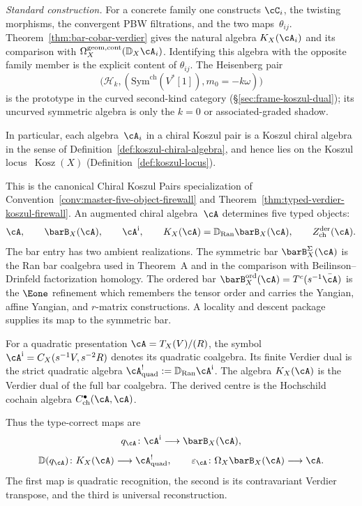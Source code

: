 \begin{definition}
\smallskip\noindent
\emph{Standard construction.}
For a concrete family one constructs $\cC_i$, the twisting morphisms,
the convergent PBW filtrations, and the two maps~$\theta_{ij}$.
Theorem~\ref{thm:bar-cobar-verdier} gives the natural algebra
$K_X(\cA_i)$ and its comparison with
$\Omega_X^{\mathrm{geom,cont}}(\mathbb D_X\cA_i)$. Identifying this
algebra with the opposite family member is the explicit content of
$\theta_{ij}$.
The Heisenberg pair
\[
\bigl(\mathcal{H}_k,
(\mathrm{Sym}^{\mathrm{ch}}(V^*[1]),m_0=-k\omega)\bigr)
\]
is the prototype in the curved second-kind category
(\S\ref{sec:frame-koszul-dual}); its uncurved symmetric algebra is
only the $k=0$ or associated-graded shadow.

\smallskip\noindent
In particular, each algebra~$\cA_i$ in a chiral Koszul pair is a
Koszul chiral algebra in the sense of
Definition~\textup{\ref{def:koszul-chiral-algebra}}, and hence lies on
the Koszul locus~$\operatorname{Kosz}(X)$
(Definition~\textup{\ref{def:koszul-locus}}).
\end{definition}

\begin{remark}\label{rem:five-object-firewall-kp}
This is the canonical Chiral Koszul Pairs specialization of
Convention~\ref{conv:master-five-object-firewall} and
Theorem~\ref{thm:typed-verdier-koszul-firewall}.
An augmented chiral algebra~$\cA$ determines five typed objects:
\[
\cA,\qquad
\barB_X(\cA),\qquad
\cA^{\mathrm i},\qquad
K_X(\cA)=\mathbb D_{\operatorname{Ran}}\barB_X(\cA),\qquad
Z^{\mathrm{der}}_{\mathrm{ch}}(\cA).
\]
The bar entry has two ambient realizations. The symmetric bar
$\barB_X^\Sigma(\cA)$ is the Ran bar coalgebra used in
Theorem~A and in the comparison with Beilinson--Drinfeld factorization
homology. The ordered bar
$\barB_X^{\mathrm{ord}}(\cA)=T^c(s^{-1}\bar\cA)$ is the
$\Eone$ refinement which remembers the tensor order and carries the
Yangian, affine Yangian, and $r$-matrix constructions. A locality and
descent package supplies its map to the symmetric bar.

For a quadratic presentation $\cA=T_X(V)/(R)$, the symbol
$\cA^{\mathrm i}=C_X(s^{-1}V,s^{-2}R)$ denotes its quadratic coalgebra. Its
finite Verdier dual is the strict quadratic algebra
$\cA^!_{\mathrm{quad}}:=\mathbb D_{\operatorname{Ran}}\cA^{\mathrm i}$.
The algebra $K_X(\cA)$ is the Verdier dual of the full bar coalgebra.
The derived centre is the Hochschild cochain algebra
$C^\bullet_{\mathrm{ch}}(\cA,\cA)$.

Thus the type-correct maps are
\[
q_\cA\colon\cA^{\mathrm i}\longrightarrow\barB_X(\cA),
\]
\[
\mathbb D(q_\cA)\colon K_X(\cA)\longrightarrow\cA^!_{\mathrm{quad}},
\qquad
\varepsilon_\cA\colon\Omega_X\barB_X(\cA)\longrightarrow\cA.
\]
The first map is quadratic recognition, the second is its
contravariant Verdier transpose, and the third is universal
reconstruction.
\end{remark}


